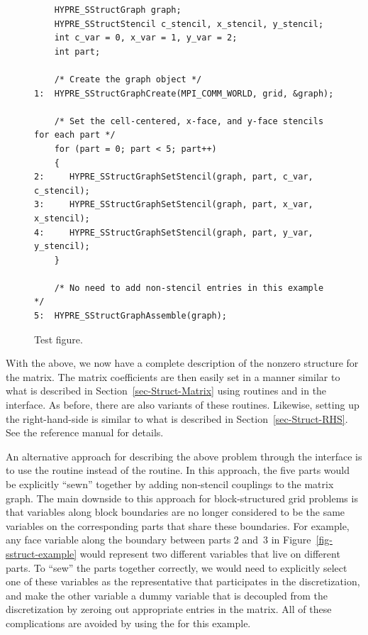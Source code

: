 \begin{figure}
\begin{minipage}{0.9\textwidth}
\begin{verbatim}
    HYPRE_SStructGraph graph;
    HYPRE_SStructStencil c_stencil, x_stencil, y_stencil;
    int c_var = 0, x_var = 1, y_var = 2;
    int part;
    
    /* Create the graph object */
1:  HYPRE_SStructGraphCreate(MPI_COMM_WORLD, grid, &graph);
    
    /* Set the cell-centered, x-face, and y-face stencils for each part */
    for (part = 0; part < 5; part++)
    {
2:     HYPRE_SStructGraphSetStencil(graph, part, c_var, c_stencil);
3:     HYPRE_SStructGraphSetStencil(graph, part, x_var, x_stencil);
4:     HYPRE_SStructGraphSetStencil(graph, part, y_var, y_stencil);
    }
    
    /* No need to add non-stencil entries in this example */
5:  HYPRE_SStructGraphAssemble(graph);

\end{verbatim}
\end{minipage}
\caption{%
Test figure.}
\label{fig-sstruct-graph}
\end{figure}

With the above, we now have a complete description of the nonzero structure for
the matrix.  The matrix coefficients are then easily set in a manner similar to
what is described in Section~\ref{sec-Struct-Matrix} using routines
 and  in the 
interface.  As before, there are also  variants of these routines.
Likewise, setting up the right-hand-side is similar to what is described in
Section~\ref{sec-Struct-RHS}.  See the \hypre{} reference manual for details.

An alternative approach for describing the above problem through the interface
is to use the  routine instead of the
 routine.  In this approach, the five parts would be
explicitly ``sewn'' together by adding non-stencil couplings to the matrix
graph.  The main downside to this approach for block-structured grid problems
is that variables along block boundaries are no longer considered to be the
same variables on the corresponding parts that share these boundaries.  For
example, any face variable along the boundary between parts 2 and~3 in
Figure~\ref{fig-sstruct-example} would represent two different variables that
live on different parts.  To ``sew'' the parts together correctly, we would
need to explicitly select one of these variables as the representative that
participates in the discretization, and make the other variable a dummy
variable that is decoupled from the discretization by zeroing out appropriate
entries in the matrix.  All of these complications are avoided by using the
 for this example.

